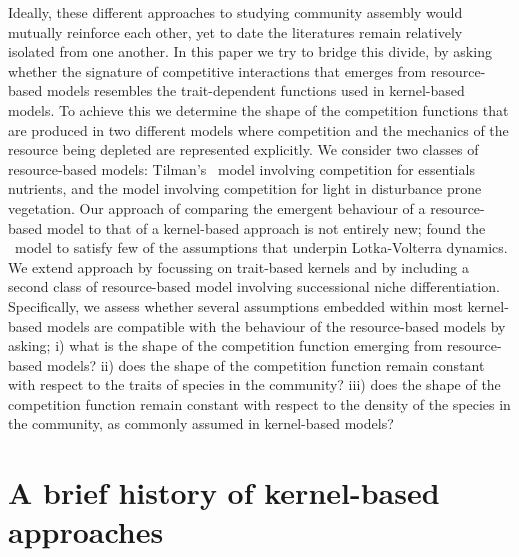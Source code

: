 \documentclass[a4paper,11pt]{article}
\begin{document}
Ideally, these different approaches to studying community assembly
would mutually reinforce each other, yet to date the literatures
remain relatively isolated from one another.
%
In this paper we try to bridge this divide, by asking whether the
signature of competitive interactions that emerges from resource-based
models resembles the trait-dependent functions used in kernel-based
models.
%
To achieve this we determine the shape of the competition functions
that are produced in two different models where competition and the
mechanics of the resource being depleted are represented explicitly.
We consider two classes of resource-based models: Tilman's
\Rstar\ model involving competition for essentials nutrients,
and the \plant model involving competition for light in disturbance prone
vegetation.
%
Our approach of comparing the emergent behaviour of a resource-based model
to that of a kernel-based approach is not entirely new; \citet{Abrams-2008} found the \Rstar\
model
to satisfy few of the assumptions that underpin Lotka-Volterra
dynamics.
%
We extend \citeauthor{Abrams-2008} approach by focussing on trait-based kernels and
by
including a second class of resource-based model involving
successional niche differentiation.
%
Specifically, we assess whether several assumptions embedded within
most kernel-based models are compatible with the behaviour of the
resource-based models by asking;
%
i) what is the shape of the competition function emerging from resource-based
models?
%
ii) does the shape of the competition function remain constant with
respect to the traits of species in the community?
%
iii) does the shape of the competition function remain constant with
respect to the density of the species in the community, as commonly
assumed in kernel-based models?

\section{A brief history of kernel-based approaches}
\end{document}
